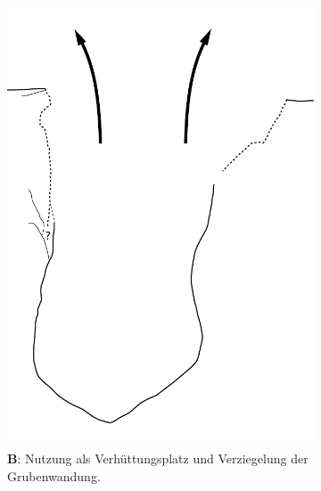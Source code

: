 \begin{figure}[!tb]
\begin{subfigure}[t]{0.32\textwidth}
		\includegraphics[width = \textwidth, page = 4]{fig/MUN87-211_Ablauf.pdf}
		\caption{\textbf{B}: Nutzung als Verhüttungsplatz und Verziegelung der Grubenwandung.}
		\label{fig:MUN87.2-1-1_Sequenz_Skizze_04}
	\end{subfigure}\hspace{2mm}
	\begin{subfigure}[t]{0.32\textwidth}

\end{subfigure}
\end{figure}
